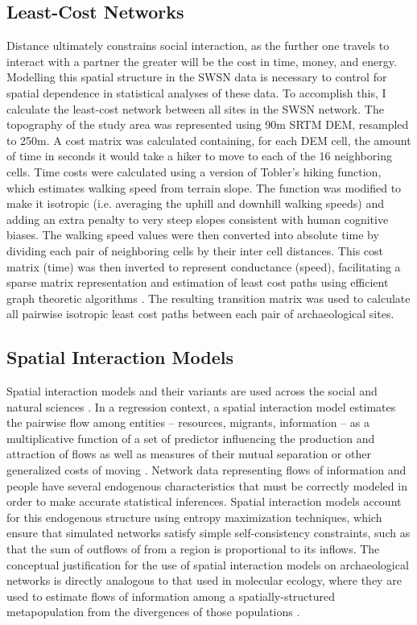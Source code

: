 \documentclass[10pt]{iopart}
\begin{document}
\subsection*{Least-Cost Networks}
Distance ultimately constrains social interaction, as the further one travels to interact with a partner the greater will be the cost in time, money, and energy. Modelling this spatial structure in the SWSN data is necessary to control for spatial dependence in statistical analyses of these data. To accomplish this, I calculate the least-cost network between all sites in the SWSN network. The topography of the study area was represented using 90m SRTM DEM, resampled to 250m. A cost matrix was calculated containing, for each DEM cell, the amount of time in seconds it would take a hiker to move to each of the 16 neighboring cells. Time costs were calculated using a version of Tobler's hiking function, which estimates walking speed from terrain slope. The function was modified to make it isotropic (i.e. averaging the uphill and downhill walking speeds) and adding an extra penalty to very steep slopes consistent with human cognitive biases. The walking speed values were then converted into absolute time by dividing each pair of neighboring cells by their inter cell distances. This cost matrix (time) was then inverted to represent conductance (speed), facilitating a sparse matrix representation and estimation of least cost paths using efficient graph theoretic algorithms \parencite{Etten2014}. The resulting transition matrix was used to calculate all pairwise isotropic least cost paths between each pair of archaeological sites. 

\subsection*{Spatial Interaction Models}
Spatial interaction models and their variants are used across the social and natural sciences \parencite{Wilson1956,workhorsegravity,Bavaud2008,Murphy2010}. In a regression context, a spatial interaction model estimates the pairwise flow among entities -- resources, migrants, information --  as a multiplicative function of a set of predictor influencing the production and attraction of flows as well as measures of their mutual separation or other generalized costs of moving \parencite{Sen1995,Fotheringham1989}. Network data representing flows of information and people have several endogenous characteristics that must be correctly modeled in order to make accurate statistical inferences. Spatial interaction models account for this endogenous structure using entropy maximization techniques, which ensure that simulated networks satisfy simple self-consistency constraints, such as that the sum of outflows of from a region is proportional to its inflows. The conceptual justification for the use of spatial interaction models on archaeological networks is directly analogous to that used in molecular ecology, where they are used to estimate flows of information among a spatially-structured metapopulation from the divergences of those populations \parencite{Murphy2010}. 
\end{document}
